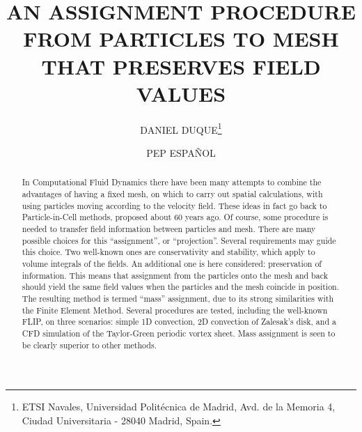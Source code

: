 \documentclass{ws-ijcm}
\begin{document}
%
\catchline{}{}{}{}{}
%


\title{AN ASSIGNMENT PROCEDURE FROM PARTICLES TO MESH THAT PRESERVES
  FIELD VALUES}


\author{DANIEL DUQUE\footnote{
  ETSI Navales, Universidad Polit\'ecnica de Madrid,
  Avd.  de la Memoria 4, Ciudad Universitaria  - 28040  Madrid, Spain. }}

\address{%
  Model Basin Research Group (CEHINAV).
  ETSI Navales, Universidad Polit\'ecnica de Madrid.
  Madrid, Spain
}

\author{PEP ESPA\~NOL}

\address{%
  Dpto. de F{\'\i}sica Fundamental.
  Universidad Nacional de Educaci\'on a Distancia.
  Madrid, Spain}



\maketitle

\begin{history}
\end{history}


\begin{abstract}
  In Computational Fluid Dynamics there have been many attempts to
  combine the advantages of having a fixed mesh, on which to carry out
  spatial calculations, with using particles moving according to the
  velocity field. These ideas in fact go back to Particle-in-Cell
  methods, proposed about 60 years ago.
%  
  Of course, some procedure is needed to transfer field information
  between particles and mesh. There are many possible choices for this
  ``assignment'', or ``projection''.
%
  Several requirements may guide this choice. Two well-known ones are
  conservativity and stability, which apply to volume integrals of the
  fields.
%
  An additional one is here considered: preservation of
  information. This means that assignment from the particles onto
  the mesh and back should yield the same field values when the particles
  and the mesh coincide in position.
%  
  The resulting method is termed ``mass'' assignment, due
  to its strong similarities with the Finite Element Method.
%
  Several procedures are tested, including the well-known FLIP, on
  three scenarios: simple 1D convection, 2D convection of Zalesak's
  disk, and a CFD simulation of the Taylor-Green periodic vortex
  sheet.  Mass assignment is seen to be clearly superior to other
  methods.
%
\end{abstract}
\end{document}
